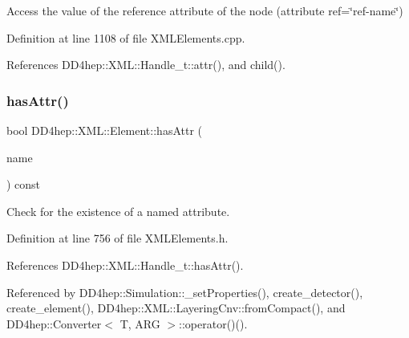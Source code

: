 Access the value of the reference attribute of the node (attribute ref=\char`\"{}ref-\/name\char`\"{}) 



Definition at line 1108 of file X\+M\+L\+Elements.\+cpp.



References D\+D4hep\+::\+X\+M\+L\+::\+Handle\+\_\+t\+::attr(), and child().

\hypertarget{class_d_d4hep_1_1_x_m_l_1_1_element_a8572738778cedf06f789e0c602e75cef}{}\label{class_d_d4hep_1_1_x_m_l_1_1_element_a8572738778cedf06f789e0c602e75cef} 
\subsubsection{\texorpdfstring{has\+Attr()}{hasAttr()}}
{\footnotesize\ttfamily bool D\+D4hep\+::\+X\+M\+L\+::\+Element\+::has\+Attr (\begin{DoxyParamCaption}\item[{const \hyperlink{namespace_d_d4hep_1_1_x_m_l_a09e5d9cc86ed782f6826dfe0778c1815}{Xml\+Char} $\ast$}]{name }\end{DoxyParamCaption}) const\hspace{0.3cm}{\ttfamily [inline]}}



Check for the existence of a named attribute. 



Definition at line 756 of file X\+M\+L\+Elements.\+h.



References D\+D4hep\+::\+X\+M\+L\+::\+Handle\+\_\+t\+::has\+Attr().



Referenced by D\+D4hep\+::\+Simulation\+::\+\_\+set\+Properties(), create\+\_\+detector(), create\+\_\+element(), D\+D4hep\+::\+X\+M\+L\+::\+Layering\+Cnv\+::from\+Compact(), and D\+D4hep\+::\+Converter$<$ T, A\+R\+G $>$\+::operator()().

\hypertarget{class_d_d4hep_1_1_x_m_l_1_1_element_a82f7e8b99c40187c6c3b0aaee2aab032}{}\label{class_d_d4hep_1_1_x_m_l_1_1_element_a82f7e8b99c40187c6c3b0aaee2aab032} 
